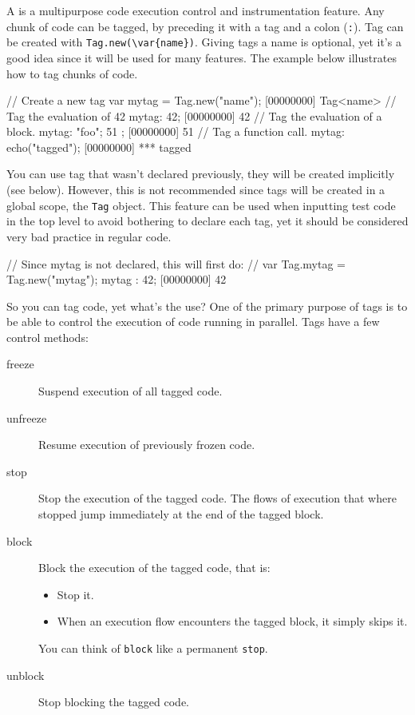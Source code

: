 A  is a multipurpose code execution control and instrumentation
feature. Any chunk of code can be tagged, by preceding it with a tag
and a colon (\lstinline{:}). Tag can be created with
\lstinline|Tag.new(\var{name})|. Giving tags a name is optional, yet it's
a good idea since it will be used for many features. The example below
illustrates how to tag chunks of code.

\begin{urbiscript}
// Create a new tag
var mytag = Tag.new("name");
[00000000] Tag<name>
// Tag the evaluation of 42
mytag: 42;
[00000000] 42
// Tag the evaluation of a block.
mytag: { "foo"; 51 };
[00000000] 51
// Tag a function call.
mytag: echo("tagged");
[00000000] *** tagged
\end{urbiscript}

You can use tag that wasn't declared previously, they will be created
implicitly (see below). However, this is not recommended since
tags will be created in a global scope, the \lstinline{Tag} object. This
feature can be used when inputting test code in the top level to avoid
bothering to declare each tag, yet it should be considered very bad
practice in regular code.

\begin{urbiscript}
// Since mytag is not declared, this will first do:
// var Tag.mytag = Tag.new("mytag");
mytag : 42;
[00000000] 42
\end{urbiscript}

So you can tag code, yet what's the use? One of the primary purpose of
tags is to be able to control the execution of code running in
parallel. Tags have a few control methods:

\begin{description}
\item[freeze] Suspend execution of all tagged code.
\item[unfreeze] Resume execution of previously frozen code.
\item[stop] Stop the execution of the tagged code. The flows of
  execution that where stopped jump immediately at the end of the
  tagged block.
\item[block] Block the execution of the tagged code, that is:
  \begin{itemize}
  \item Stop it.
  \item When an execution flow encounters the tagged block, it simply
    skips it.
  \end{itemize}
  You can think of \lstinline{block} like a permanent \lstinline{stop}.
\item[unblock] Stop blocking the tagged code.
\end{description}

